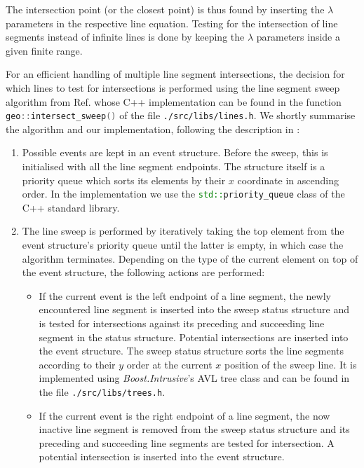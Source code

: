 The intersection point (or the closest point) is thus found by inserting the $\lambda$ parameters in the respective line equation. 
Testing for the intersection of line segments instead of infinite lines is done by keeping the $\lambda$ parameters inside a given 
finite range.

For an efficient handling of multiple line segment intersections, the decision for which lines to test for intersections is
performed using the line segment sweep algorithm from Ref. \cite[pp. 69-80]{FUH_geo2020} whose C++ implementation can be
found in the function \lstinline[language=C++]|geo::intersect_sweep()| of the file \lstinline|./src/libs/lines.h|.
We shortly summarise the algorithm and our implementation, following the description in \cite[pp. 69-80]{FUH_geo2020}:
\begin{enumerate}
	\item Possible events are kept in an event structure. Before the sweep, this is initialised with all the line segment
		endpoints. The structure itself is a priority queue which sorts its elements by their $x$ coordinate in ascending order.
		In the implementation we use the \lstinline[language=C++]|std::priority_queue| class of the C++ standard library.
	\item The line sweep is performed by iteratively taking the top element from the event structure's priority queue until
		the latter is empty, in which case the algorithm terminates.
		Depending on the type of the current element on top of the event structure, the following actions are performed:
		\begin{itemize}
			\item If the current event is the left endpoint of a line segment, the newly encountered line segment is
				inserted into the sweep status structure and is tested for intersections against its preceding and succeeding
				line segment in the status structure. Potential intersections are inserted into the event structure.
				The sweep status structure sorts the line segments according to their $y$ order at the current $x$ position
				of the sweep line. It is implemented using \textit{Boost.Intrusive}'s \cite{web_boost_intrusive}
				AVL tree class \cite{web_boost_intrusive_avltree} and can be found in the file \lstinline|./src/libs/trees.h|.
			\item If the current event is the right endpoint of a line segment, the now inactive line segment is
				removed from the sweep status structure and its preceding and succeeding line segments are tested
				for intersection. A potential intersection is inserted into the event structure.

\end{itemize}
\end{enumerate}
